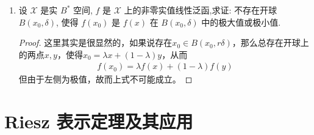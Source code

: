 \begin{enumerate}[leftmargin=2cm, label=\arabic*]
\begin{enumerate}[leftmargin=1cm, label=(\arabic*)]
    \end{enumerate}
    \item 设 $\mathscr{X}$ 是实 $B^{*}$ 空间, $f$ 是 $\mathscr{X}$ 上的非零实值线性泛函,求证: 不存在开球 $B\left(x_{0}, \delta\right)$, 使得 $f\left(x_{0}\right)$ 是 $f(x)$ 在 $B\left(x_{0}, \delta\right)$ 中的极大值或极小值.
    \begin{proof}
        这里其实是很显然的，如果说存在$x_0\in B(x_0,r\delta)$，那么总存在开球上的两点$x,y$，使得$x_0 = \lambda x+ (1-\lambda) y$，从而
        \begin{align*}
            f(x_0) = \lambda f(x) + (1-\lambda) f(y) 
        \end{align*}
        但由于左侧为极值，故而上式不可能成立。
    \end{proof}
\end{enumerate}

\section{Riesz 表示定理及其应用}
